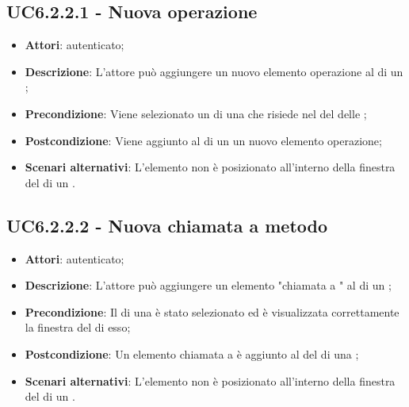 \subsection{UC6.2.2.1 - Nuova operazione}
\label{ssec:UC6.2.2.1}
\begin{itemize}
\item \textbf{Attori}:  autenticato;
\item \textbf{Descrizione}: L'attore può aggiungere un nuovo elemento operazione al  di un ;
\item \textbf{Precondizione}: Viene selezionato un  di una  che risiede nel  del  delle  ;
\item \textbf{Postcondizione}: Viene aggiunto al  di un  un nuovo elemento operazione;
\item \textbf{Scenari alternativi}: L'elemento non è posizionato all'interno della finestra del  di un .
\end{itemize}
\subsection{UC6.2.2.2 - Nuova chiamata a metodo}
\label{ssec:UC6.2.2.2}
\begin{itemize}
\item \textbf{Attori}:  autenticato;
\item \textbf{Descrizione}: L'attore può aggiungere un elemento "chiamata a " al  di un ;
\item \textbf{Precondizione}: Il  di una  è stato selezionato ed è visualizzata correttamente la finestra del  di esso;
\item \textbf{Postcondizione}: Un elemento chiamata a  è aggiunto al  del  di una ;
\item \textbf{Scenari alternativi}: L'elemento non è posizionato all'interno della finestra del  di un .
\end{itemize}
